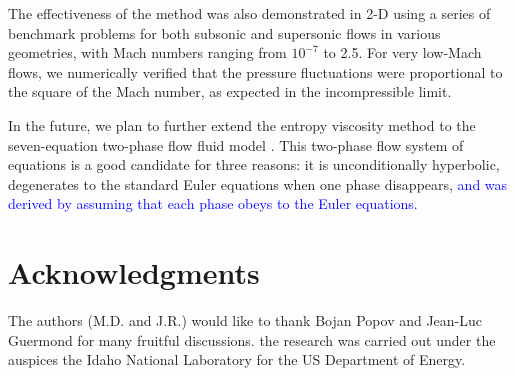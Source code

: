 \documentclass[preprint,10pt]{elsarticle}
\newcommand{\tcb}[1]{\textcolor{blue}{#1}}
\begin{document}
The effectiveness of the method was also demonstrated in 2-D using a series of benchmark problems
for both subsonic and supersonic flows in various geometries, with Mach numbers ranging from $10^{-7}$ to 
2.5. For very low-Mach flows, we numerically verified that the pressure fluctuations were proportional to 
the square of the Mach number, as expected in the incompressible limit.

In the future, we plan to further extend the entropy viscosity method to the seven-equation two-phase flow fluid model \cite{SEM}. 
This two-phase flow system of equations is a good candidate for three reasons: it is unconditionally hyperbolic, degenerates to the standard Euler equations when one phase disappears, \tcb{and was derived by assuming that each phase obeys to the Euler equations.}


\section*{Acknowledgments} 
The authors (M.D. and J.R.) would like to thank Bojan Popov and Jean-Luc Guermond for many fruitful discussions.  
the research was carried out under the auspices the Idaho National Laboratory for the US Department of Energy.


\newpage
\appendix
\end{document}
